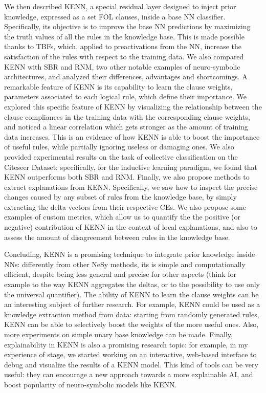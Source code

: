 We then described KENN, a special residual layer designed to inject prior knowledge, expressed as a set FOL clauses, inside a base NN classifier. Specifically, its objective is to improve the base NN predictions by maximizing the truth values of all the rules in the knowledge base. This is made possible thanks to TBFs, which, applied to preactivations from the NN, increase the satisfaction of the rules with respect to the training data. We also compared KENN with SBR and RNM, two other notable examples of neuro-symbolic architectures, and analyzed their differences, advantages and shortcomings.
A remarkable feature of KENN is its capability to learn the clause weights, parameters associated to each logical rule, which define their importance. We explored this specific feature of KENN by visualizing the relationship between the clause compliances in the training data with the corresponding clause weights, and noticed a linear correlation which gets stronger as the amount of training data increases. This is an evidence of how KENN is able to boost the importance of useful rules, while partially ignoring useless or damaging ones. We also provided experimental results on the task of collective classification on the Citeseer Dataset: specifically, for the inductive learning paradigm, we found that KENN outperforms both SBR and RNM. Finally, we also propose methods to extract explanations from KENN. Specifically, we saw how to inspect the precise changes caused by any subset of rules from the knowledge base, by simply extracting the delta vectors from their respective CEs. We also propose some examples of custom metrics, which allow us to quantify the the positive (or negative) contribution of KENN in the context of local explanations, and also to assess the amount of disagreement between rules in the knowledge base.

Concluding, KENN is a promising technique to integrate prior knowledge inside NNs: differently from other NeSy methods, its is simple and computationally efficient, despite being less general and precise for other aspects (think for example to the way KENN aggregates the deltas, or to the possibility to use only the universal quantifier). The ability of KENN to learn the clause weights can be an interesting subject of further research. For example, KENN could be used as a knowledge extraction method from data: starting from randomly generated rules, KENN can be able to selectively boost the weights of the more useful ones. Also, more experiments on simple unary base knowledge can be made. 
Finally, explainability in KENN is also a promising research topic: for example, in my experience of stage, we started working on an interactive, web-based interface to debug and visualize the results of a KENN model. This kind of tools can be very useful: they can encourage a new approach towards a more explainable AI, and boost popularity of neuro-symbolic models like KENN. 